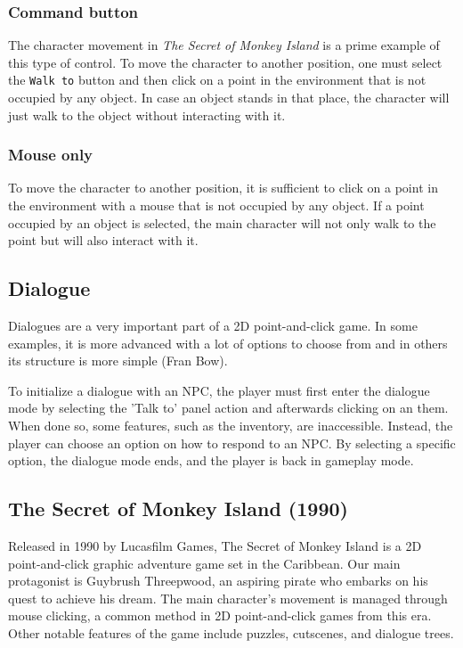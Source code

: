 \subsubsection{Command button}
The character movement in \textit{The Secret of Monkey Island} is a prime example of this type of control. To move the character to another position, one must select the \texttt{Walk to} button and then click on a point in the environment that is not occupied by any object. In case an object stands in that place, the character will just walk to the object without interacting with it.

\subsubsection{Mouse only}
To move the character to another position, it is sufficient to click on a point in the environment with a mouse that is not occupied by any object. If a point occupied by an object is selected, the main character will not only walk to the point but will also interact with it.

\subsection{Dialogue}
Dialogues are a very important part of a 2D point-and-click game. In some examples, it is more advanced with a lot of options to choose from and in others its structure is more simple (Fran Bow).  

To initialize a dialogue with an NPC, the player must first enter the dialogue mode by selecting the 'Talk to' panel action and afterwards clicking on an them. When done so, some features, such as the inventory, are inaccessible. Instead, the player can choose an option on how to respond to an NPC. By selecting a specific option, the dialogue mode ends, and the player is back in gameplay mode.




\subsection{The Secret of Monkey Island (1990)}
Released in 1990 by Lucasfilm Games, The Secret of Monkey Island is a 2D point-and-click graphic adventure game set in the Caribbean. Our main protagonist is Guybrush Threepwood, an aspiring pirate who embarks on his quest to achieve his dream.
The main character's movement is managed through mouse clicking, a common method in 2D point-and-click games from this era. Other notable features of the game include puzzles, cutscenes, and dialogue trees. 

